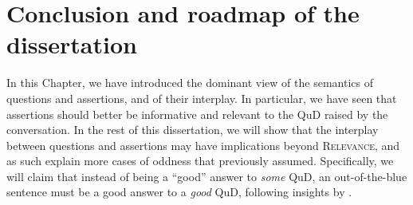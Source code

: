 %
%
%
%
%


\section{Conclusion and roadmap of the dissertation}

In this Chapter, we have introduced the dominant view of the semantics of questions and assertions, and of their interplay. In particular, we have seen that assertions should better be informative and relevant to the QuD raised by the conversation. In the rest of this dissertation, we will show that the interplay between questions and assertions may have implications beyond \textsc{Relevance}, and as such explain more cases of oddness that previously assumed. Specifically, we will claim that instead of being a ``good'' answer to \textit{some} QuD, an out-of-the-blue sentence must be a good answer to a \textit{good} QuD, following insights by \textcite{Katzir2015}.

